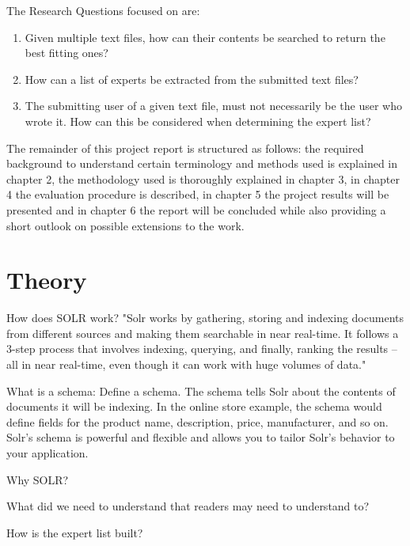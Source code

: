 \documentclass[a4paper,12pt]{article}
\begin{document}
The Research Questions focused on are:
\begin{enumerate}
\item Given multiple text files, how can their contents be searched to return the best fitting ones?  
\item How can a list of experts be extracted from the submitted text files?  
\item The submitting user of a given text file, must not necessarily be the user who wrote it. 
      How can this be considered when determining the expert list?
\end{enumerate}

The remainder of this project report is structured as follows: 
the required background to understand certain terminology and methods used is explained in chapter 2, 
the methodology used is thoroughly explained in chapter 3, 
in chapter 4 the evaluation procedure is described, 
in chapter 5 the project results will be presented 
and in chapter 6 the report will be concluded while also providing a short outlook on possible extensions to the work.


\section{Theory} %
How does SOLR work?
"Solr works by gathering, storing and indexing documents from different sources and making them searchable in near real-time. 
It follows a 3-step process that involves indexing, querying, and finally, ranking the results – all in near real-time, even though it can work with huge volumes of data." %

What is a schema:
Define a schema. The schema tells Solr about the contents of documents it will be indexing. 
In the online store example, the schema would define fields for the product name, description, price, manufacturer, and so on. 
Solr’s schema is powerful and flexible and allows you to tailor Solr’s behavior to your application. %

Why SOLR?

What did we need to understand that readers may need to understand to?

How is the expert list built?
\end{document}
